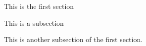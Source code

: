 
This is the first section


This is a subsection


This is another subsection of the first section.
